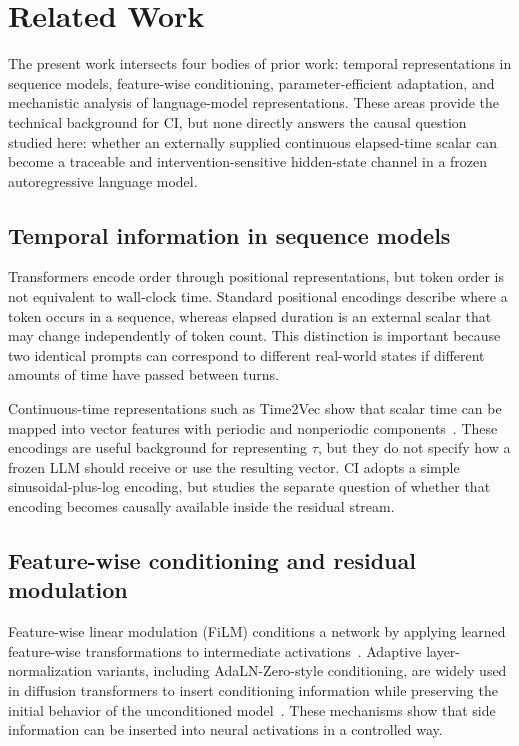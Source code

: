 \documentclass[conference,10pt]{IEEEtran}
\newcommand{\CI}{\textsc{CI}}
\newcommand{\Tau}{\tau}
\begin{document}
\section{Related Work}

The present work intersects four bodies of prior work: temporal representations in sequence models, feature-wise conditioning, parameter-efficient adaptation, and mechanistic analysis of language-model representations. These areas provide the technical background for \CI{}, but none directly answers the causal question studied here: whether an externally supplied continuous elapsed-time scalar can become a traceable and intervention-sensitive hidden-state channel in a frozen autoregressive language model.

\subsection{Temporal information in sequence models}

Transformers encode order through positional representations, but token order is not equivalent to wall-clock time. Standard positional encodings describe where a token occurs in a sequence, whereas elapsed duration is an external scalar that may change independently of token count. This distinction is important because two identical prompts can correspond to different real-world states if different amounts of time have passed between turns.

Continuous-time representations such as Time2Vec show that scalar time can be mapped into vector features with periodic and nonperiodic components~\cite{vaswani2017attention,kazemi2019time2vec}. These encodings are useful background for representing $\Tau$, but they do not specify how a frozen LLM should receive or use the resulting vector. \CI{} adopts a simple sinusoidal-plus-log encoding, but studies the separate question of whether that encoding becomes causally available inside the residual stream.

\subsection{Feature-wise conditioning and residual modulation}

Feature-wise linear modulation (FiLM) conditions a network by applying learned feature-wise transformations to intermediate activations~\cite{perez2018film}. Adaptive layer-normalization variants, including AdaLN-Zero-style conditioning, are widely used in diffusion transformers to insert conditioning information while preserving the initial behavior of the unconditioned model~\cite{peebles2023dit}. These mechanisms show that side information can be inserted into neural activations in a controlled way.
\end{document}
